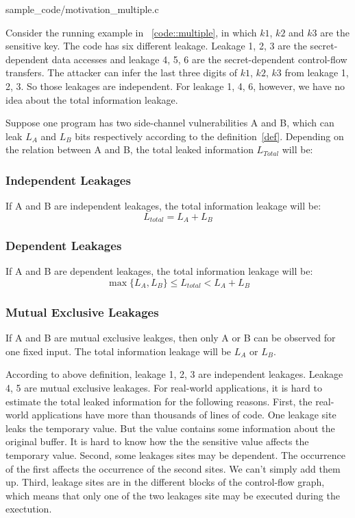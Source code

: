 
                 {sample_code/motivation_multiple.c}

                

Consider the running example in ~\ref{code::multiple}, in which $k1$, $k2$ and $k3$ are
the sensitive key. The code has six different leakage. Leakage 1, 2, 3 are the secret-dependent
data accesses and leakage 4, 5, 6 are the secret-dependent control-flow transfers.  
The attacker can infer the last three digits of
$k1$, $k2$, $k3$ from leakage 1, 2, 3. So those leakages are independent. For leakage 1, 4, 6, however,
we have no idea about the total information leakage.


Suppose one program has two side-channel vulnerabilities A and B, which can leak $L_A$ and $L_B$ bits respectively
according to the definition~\ref{def}. 
Depending on the relation between A and B, the total leaked information $L_{Total}$ will be:

\subsubsection{Independent Leakages}
If A and B are independent leakages, the total information leakage will be:
$$L_{total} = L_A + L_B $$

\subsubsection{Dependent Leakages}
If A and B are dependent leakages, the total information leakage will be:
$$\max{\{L_A, L_B\}}  \leq L_{total} < L_A + L_B$$

\subsubsection{Mutual Exclusive Leakages}
If A and B are mutual exclusive leakges, then only A or B can be observed for one fixed input.
The total information leakage will be $L_A$ or $L_B$.

According to above definition, leakage 1, 2, 3 are independent leakages. Leakage 4, 5
are mutual exclusive leakages. 
For real-world applications, it is hard to estimate the total leaked information for the following reasons.
First, the real-world applications have more than thousands of lines of code. One leakage site leaks the temporary value. 
But the value contains some information about the original buffer. It is hard to know how the 
the sensitive value affects the temporary value. Second, some leakages sites may be
dependent. The occurrence of the first affects the occurrence of the second sites. We 
can't simply add them up. Third, leakage sites are in the different blocks of the 
control-flow graph, which means that only one of the two leakages site may be executed
during the exectution.

